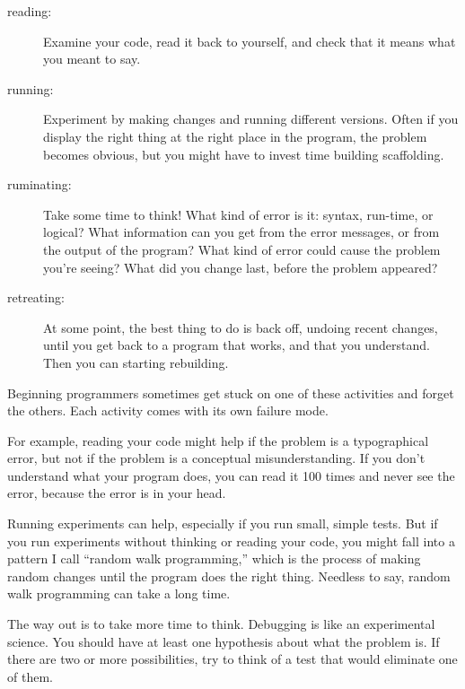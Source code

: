 \begin{description}

\item[reading:] Examine your code, read it back to yourself, and
check that it means what you meant to say.

\item[running:] Experiment by making changes and running different
versions.  Often if you display the right thing at the right place
in the program, the problem becomes obvious, but you might have to invest time building scaffolding.

\item[ruminating:] Take some time to think!  What kind of error
is it: syntax, run-time, or logical?  What information can you get from
the error messages, or from the output of the program?  What kind of
error could cause the problem you're seeing?  What did you change
last, before the problem appeared?

\item[retreating:] At some point, the best thing to do is back
off, undoing recent changes, until you get back to a program that
works, and that you understand.  Then you can starting rebuilding.

\end{description}

Beginning programmers sometimes get stuck on one of these activities
and forget the others.  Each activity comes with its own failure
mode.

For example, reading your code might help if the problem is a
typographical error, but not if the problem is a conceptual
misunderstanding.  If you don't understand what your program does, you
can read it 100 times and never see the error, because the error is in
your head.

Running experiments can help, especially if you run small, simple
tests.  But if you run experiments without thinking or reading your
code, you might fall into a pattern I call ``random walk programming,''
which is the process of making random changes until the program
does the right thing.  Needless to say, random walk programming
can take a long time.


The way out is to take more time to think.  Debugging is like an
experimental science.  You should have at least one hypothesis about
what the problem is.  If there are two or more possibilities, try to
think of a test that would eliminate one of them.

